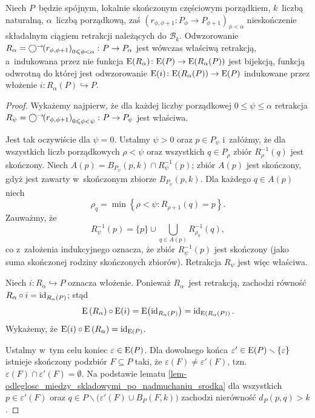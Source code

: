 \begin{lem}\label{lem-zlozenie_Bk_retrakcji}
Niech $P$~będzie spójnym, lokalnie skończonym częściowym porządkiem, $k$~liczbą naturalną, $\alpha$~liczbą porządkową, zaś $\left(r_{\phi,\phi+1}\colon P_{\phi}\to P_{\phi+1}\right)_{\phi<\alpha}$ nieskończenie składalnym ciągiem retrakcji należących do $\mathcal{B}_k$. Odwzorowanie \mbox{$R_\alpha=\bigcirc^\rightarrow\!\!\left(r_{\phi,\phi+1}\right)_{0\leqslant \phi<\alpha}\colon P\to P_{\alpha}$} jest wówczas właściwą retrakcją, a~indukowana przez nie funkcja $\mathrm{E}(R_\alpha)\colon \mathrm{E}(P)\to \mathrm{E}(R_\alpha(P))$ jest bijekcją, funkcją odwrotną do której jest odwzorowanie $\mathrm{E}(i)\colon \mathrm{E}(R_\alpha(P))\to \mathrm{E}(P)$ indukowane przez włożenie $i\colon R_\alpha(P)\hookrightarrow P$.
\end{lem}
\begin{proof}
Wykażemy najpierw, że dla każdej liczby porządkowej $0\leq \psi\leq\alpha$ retrakcja $R_\psi=\bigcirc^\rightarrow\!\!\left(r_{\phi,\phi+1}\right)_{0\leqslant \phi<\psi}\colon P\to P_\psi$ jest właściwa.

Jest tak oczywiście dla $\psi=0$. Ustalmy $\psi>0$ oraz $p\in P_\psi$ i~załóżmy, że dla wszystkich liczb porządkowych $\rho<\psi$ oraz wszystkich $q\in P_\rho$ zbiór $R_\rho^{-1}(q)$ jest skończony. Niech $A(p)=B_{P_\psi}(p,k)\cap R_{\psi}^{-1}(p)$; zbiór $A(p)$ jest skończony, gdyż jest zawarty w~skończonym zbiorze $B_{P_\psi}(p,k)$. Dla każdego $q\in A(p)$ niech \[\rho_q=\min\left\{\rho< \psi:R_{\rho+1}(q)=p\right\}.\] Zauważmy, że \[R_{\psi}^{-1}(p)=\{p\}\cup \bigcup_{q\in A(p)}R^{-1}_{\rho_q}(q),\] co z~założenia indukcyjnego oznacza, że zbiór $R_{\psi}^{-1}(p)$ jest skończony (jako suma skończonej rodziny skończonych zbiorów). Retrakcja $R_\psi$ jest więc właściwa.

Niech $i\colon R_\alpha\hookrightarrow P$ oznacza włożenie. Ponieważ $R_\alpha$~jest retrakcją, zachodzi równość $R_\alpha\circ i=\operatorname{id}_{R_\alpha(P)}$; stąd \[\mathrm{E}\left(R_\alpha\right)\circ \mathrm{E}(i)=\mathrm{E}\bigl(\operatorname{id}_{R_\alpha(P)}\bigr)=\operatorname{id}_{\mathrm{E}\left(R_\alpha(P)\right)}.\] Wykażemy, że $\mathrm{E}(i)\circ \mathrm{E}\left(R_\alpha\right)=\operatorname{id}_{\mathrm{E}(P)}$.

Ustalmy w~tym celu koniec $\varepsilon\in\mathrm{E}(P)$. Dla dowolnego końca $\varepsilon'\in\mathrm{E}(P)\smallsetminus\{\varepsilon\}$ istnieje skończony podzbiór $F\subseteq P$ taki, że $\varepsilon(F)\not=\varepsilon'(F)$, tzn.~$\varepsilon(F)\cap \varepsilon'(F)=\emptyset$. Na podstawie lematu \ref{lem-odleglosc_miedzy_skladowymi_po_nadmuchaniu_srodka} dla wszystkich $p\in \varepsilon'(F)$ oraz $q\in P\smallsetminus \bigl(\varepsilon'(F)\cup B_P(F,k)\bigr)$ zachodzi nierówność $d_P(p,q)>k$. 


\end{proof}

